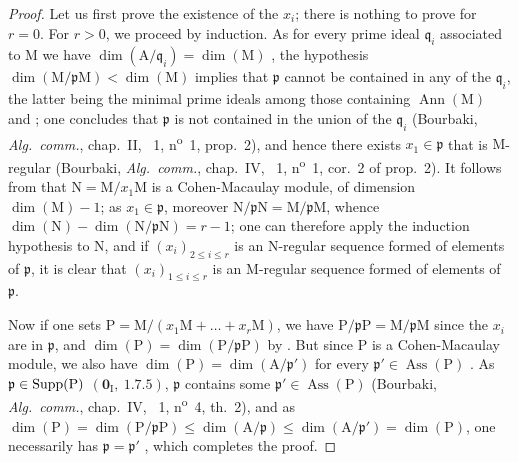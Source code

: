 \begin{proof}
Let us first prove the existence of the $x_i$; there is nothing to prove for $r=0$.
For $r>0$, we proceed by induction.
As for every prime ideal $\mathfrak{q}_i$ associated to $\mathrm{M}$ we have $\dim(\mathrm{A}/\mathfrak{q}_i)=\dim(\mathrm{M})$ , the hypothesis $\dim(\mathrm{M}/\mathfrak{p}\mathrm{M})<\dim(\mathrm{M})$ implies that $\mathfrak{p}$ cannot be contained in any of the $\mathfrak{q}_i$, the latter being the minimal prime ideals among those containing $\operatorname{Ann}(\mathrm{M})$  and ; one concludes that $\mathfrak{p}$ is not contained in the union of the $\mathfrak{q}_i$ (Bourbaki, \emph{Alg.~comm.}, chap.~II, \textsection~1, n\textsuperscript{o}~1, prop.~2), and hence there exists $x_1\in\mathfrak{p}$ that is $\mathrm{M}$-regular (Bourbaki, \emph{Alg.~comm.}, chap.~IV, \textsection~1, n\textsuperscript{o}~1, cor.~2 of prop.~2).
It follows from  that $\mathrm{N}=\mathrm{M}/x_1\mathrm{M}$ is a Cohen-Macaulay module, of dimension $\dim(\mathrm{M})-1$; as $x_1\in\mathfrak{p}$, moreover $\mathrm{N}/\mathfrak{p}\mathrm{N}=\mathrm{M}/\mathfrak{p}\mathrm{M}$, whence $\dim(\mathrm{N})-\dim(\mathrm{N}/\mathfrak{p}\mathrm{N})=r-1$; one can therefore apply the induction hypothesis to $\mathrm{N}$, and if $(x_i)_{2\leq i\leq r}$ is an $\mathrm{N}$-regular sequence formed of elements of $\mathfrak{p}$, it is clear that $(x_i)_{1\leq i\leq r}$ is an $\mathrm{M}$-regular sequence formed of elements of $\mathfrak{p}$.

Now if one sets $\mathrm{P}=\mathrm{M}/(x_1\mathrm{M}+\ldots+x_r\mathrm{M})$, we have $\mathrm{P}/\mathfrak{p}\mathrm{P}=\mathrm{M}/\mathfrak{p}\mathrm{M}$ since the $x_i$ are in $\mathfrak{p}$, and $\dim(\mathrm{P})=\dim(\mathrm{P}/\mathfrak{p}\mathrm{P})$ by .
But since $\mathrm{P}$ is a Cohen-Macaulay module, we also have $\dim(\mathrm{P})=\dim(\mathrm{A}/\mathfrak{p}')$ for every $\mathfrak{p}'\in\operatorname{Ass}(\mathrm{P})$ .
As $\mathfrak{p}\in\operatorname{Supp}(\mathrm{P})$ $(\mathbf{0}_\mathrm{I},~1.7.5)$, $\mathfrak{p}$ contains some $\mathfrak{p}'\in\operatorname{Ass}(\mathrm{P})$ (Bourbaki, \emph{Alg.~comm.}, chap.~IV, \textsection~1, n\textsuperscript{o}~4, th.~2), and as $\dim(\mathrm{P})=\dim(\mathrm{P}/\mathfrak{p}\mathrm{P})\leq\dim(\mathrm{A}/\mathfrak{p})\leq\dim(\mathrm{A}/\mathfrak{p}')=\dim(\mathrm{P})$, one necessarily has $\mathfrak{p}=\mathfrak{p}'$ , which completes the proof.
\end{proof}

